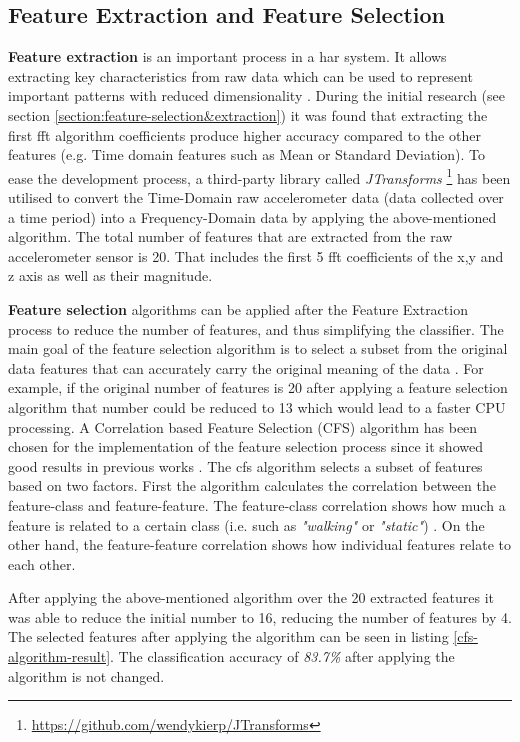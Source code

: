     \subsection{Feature Extraction and Feature Selection}
    \textbf{Feature extraction} is an important process in a \gls{har} system. It allows extracting key characteristics from raw data which can be used to represent important patterns with reduced dimensionality \citep[154]{torreshuitzil2015b}. During the initial research (see section \ref{section:feature-selection&extraction}) it was found that extracting the first \gls{fft} algorithm coefficients produce higher accuracy compared to the other features (e.g. Time domain features such as Mean or Standard Deviation). To ease the development process, a third-party library called \textit{JTransforms} \footnote{\url{https://github.com/wendykierp/JTransforms}} has been utilised to convert the Time-Domain raw accelerometer data (data collected over a time period) into a Frequency-Domain data by applying the above-mentioned algorithm. The total number of features that are extracted from the raw accelerometer sensor is 20. That includes the first 5 \gls{fft} coefficients of the x,y and z axis as well as their magnitude. 
    
    \textbf{Feature selection} algorithms can be applied after the Feature Extraction process to reduce the number of features, and thus simplifying the classifier. The main goal of the feature selection algorithm is to select a subset from the original data features that can accurately carry the original meaning of the data \citep[22]{wu2008}. For example, if the original number of features is 20 after applying a feature selection algorithm that number could be reduced to 13 which would lead to a faster CPU processing. A Correlation based Feature Selection (CFS) algorithm has been chosen for the implementation of the feature selection process since it showed good results in previous works \citep[220-224]{dinhle2015}. The \gls{cfs} algorithm selects a subset of features based on two factors. First the algorithm calculates the correlation between the feature-class and feature-feature. The feature-class correlation shows how much a feature is related to a certain class (i.e. such as \textit{"walking"} or \textit{"static"}) \citep{4021531}. On the other hand, the feature-feature correlation shows how individual features relate to each other.
    
    After applying the above-mentioned algorithm over the 20 extracted features it was able to reduce the initial number to 16, reducing the number of features by 4. The selected features after applying the algorithm can be seen in listing \ref{cfs-algorithm-result}. The classification accuracy of \textit{83.7\%} after applying the algorithm is not changed.
    
